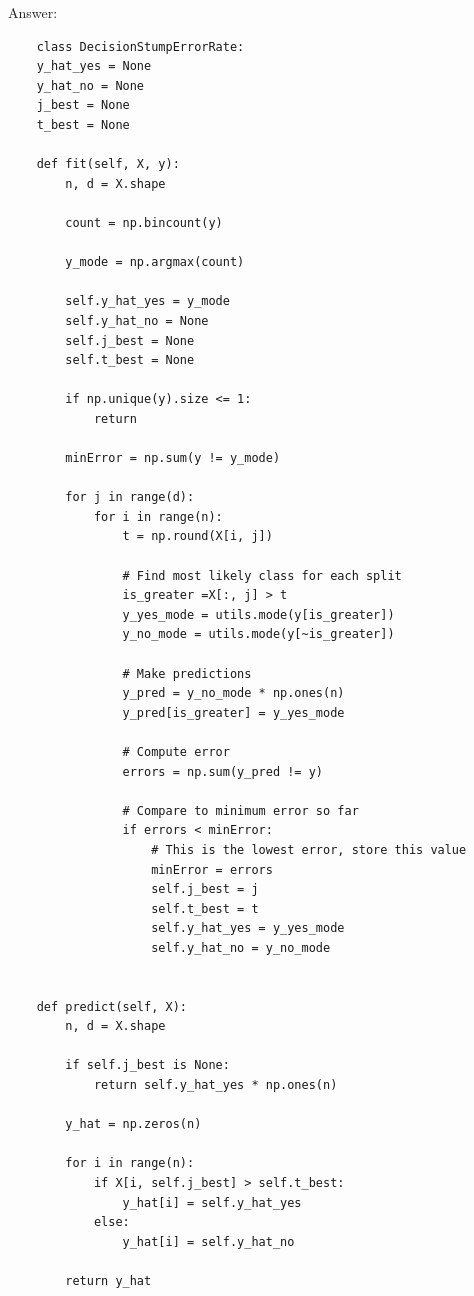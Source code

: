 \documentclass{article}
\newenvironment{answer}{\par\begingroup\color{gre}Answer: }{\endgroup}
\begin{document}
  \begin{answer}
    \begin{lstlisting}
    class DecisionStumpErrorRate:
    y_hat_yes = None
    y_hat_no = None
    j_best = None
    t_best = None

    def fit(self, X, y):
        n, d = X.shape
        
        count = np.bincount(y)

        y_mode = np.argmax(count)

        self.y_hat_yes = y_mode
        self.y_hat_no = None
        self.j_best = None
        self.t_best = None

        if np.unique(y).size <= 1:
            return

        minError = np.sum(y != y_mode)

        for j in range(d):
            for i in range(n):
                t = np.round(X[i, j])

                # Find most likely class for each split
                is_greater =X[:, j] > t
                y_yes_mode = utils.mode(y[is_greater])
                y_no_mode = utils.mode(y[~is_greater])

                # Make predictions
                y_pred = y_no_mode * np.ones(n)
                y_pred[is_greater] = y_yes_mode

                # Compute error
                errors = np.sum(y_pred != y)

                # Compare to minimum error so far
                if errors < minError:
                    # This is the lowest error, store this value
                    minError = errors
                    self.j_best = j
                    self.t_best = t
                    self.y_hat_yes = y_yes_mode
                    self.y_hat_no = y_no_mode
        

    def predict(self, X):
        n, d = X.shape

        if self.j_best is None:
            return self.y_hat_yes * np.ones(n)
        
        y_hat = np.zeros(n)

        for i in range(n):
            if X[i, self.j_best] > self.t_best:
                y_hat[i] = self.y_hat_yes
            else:
                y_hat[i] = self.y_hat_no

        return y_hat
  \end{lstlisting}
  \end{answer}
\end{document}
